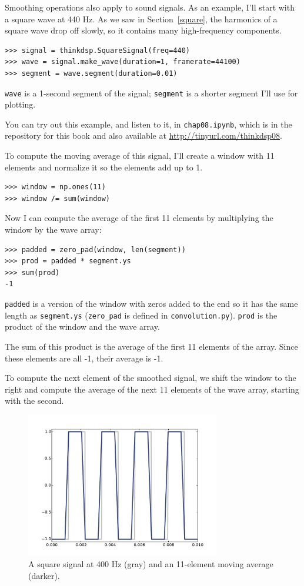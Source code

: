 \documentclass[12pt]{book}
\begin{document}
Smoothing operations also apply to sound signals.  As an example, I'll
start with a square wave at 440 Hz.  As we saw in
Section~\ref{square}, the harmonics of a square wave drop off
slowly, so it contains many high-frequency components.

\begin{verbatim}
>>> signal = thinkdsp.SquareSignal(freq=440)
>>> wave = signal.make_wave(duration=1, framerate=44100)
>>> segment = wave.segment(duration=0.01)
\end{verbatim}

{\tt wave} is a 1-second segment of the signal; {\tt segment}
is a shorter segment I'll use for plotting.

You can try out this example, and listen to it, in
{\tt chap08.ipynb}, which is in the repository for this
book and also available at \url{http://tinyurl.com/thinkdsp08}.

To compute the moving average of this signal, I'll create
a window with 11 elements and normalize it so the elements
add up to 1.

\begin{verbatim}
>>> window = np.ones(11)
>>> window /= sum(window)
\end{verbatim}

Now I can compute the average of the first 11 elements by
multiplying the window by the wave array:

\begin{verbatim}
>>> padded = zero_pad(window, len(segment))
>>> prod = padded * segment.ys
>>> sum(prod)
-1
\end{verbatim}

{\tt padded} is a version of the window with zeros added to
the end so it has the same length as {\tt segment.ys}
(\verb"zero_pad" is defined in {\tt convolution.py}).
{\tt prod} is the product of the window and the wave array.

The sum of this product is the average of the first 11 elements
of the array.  Since these elements are all -1, their average
is -1.

To compute the next element of the smoothed signal, we shift the
window to the right and compute the average of the next 11 elements of
the wave array, starting with the second.

\begin{figure}
\centerline{\includegraphics[height=2.5in]{figs/convolution2.pdf}}
\caption{A square signal at 400 Hz (gray) and an 11-element
moving average (darker).}
\label{fig.convolution2}
\end{figure}
\end{document}
